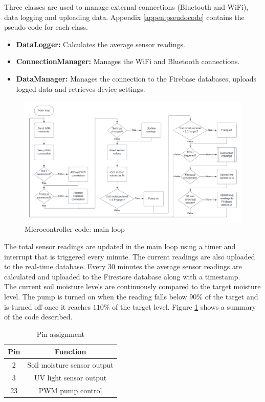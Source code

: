 Three classes are used to manage external connections (Bluetooth and WiFi), data logging and uploading data. Appendix \ref{appen:pseudocode} contains the pseudo-code for each class.
\begin{itemize}
    \item \textbf{DataLogger:} Calculates the average sensor readings.
    \item \textbf{ConnectionManager:} Manages the WiFi and Bluetooth connections.
    \item \textbf{DataManager:} Manages the connection to the Firebase databases, uploads logged data and retrieves device settings.
\end{itemize}

\begin{figure}[!h]
    \centering
    \includegraphics[width= \textwidth]{Report/detail_design/fig/main_loop_flow.png}
    \caption{Microcontroller code: main loop}
    \label{fig:main_loop_flow}
\end{figure}

The total sensor readings are updated in the main loop using a timer and interrupt that is triggered every minute. The current readings are also uploaded to the real-time database. Every 30 minutes the average sensor readings are calculated and uploaded to the Firestore database along with a timestamp.
\\
The current soil moisture levels are continuously compared to the target moisture level. The pump is turned on when the reading falls below $90\%$ of the target and is turned off once it reaches $110\%$ of the target level. Figure \ref{fig:main_loop_flow} shows a summary of the code described. 

\begin{table}[!h]
    \centering
    \begin{tabular}{|c|c|}
        \hline
        Pin & Function \\
        \hline
        2 & Soil moisture sensor output \\
        3 & UV light sensor output \\
        23 & PWM pump control \\
        \hline
    \end{tabular}
    \caption{Pin assignment}
    \label{tab:pin_assignment}
\end{table}

